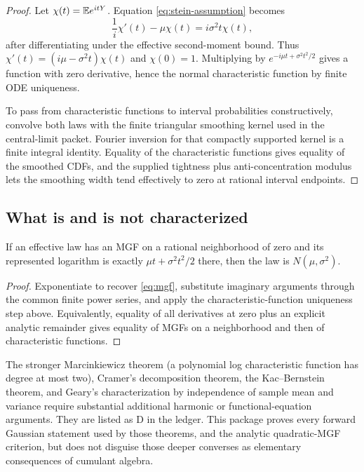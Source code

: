 \begin{proof}
Let $\chi(t)=\mathbb E e^{itY}$.  Equation \eqref{eq:stein-assumption} becomes
\[
 \frac1i\chi'(t)-\mu\chi(t)=i\sigma^2t\chi(t),
\]
after differentiating under the effective second-moment bound.  Thus
$\chi'(t)=(i\mu-\sigma^2t)\chi(t)$ and $\chi(0)=1$.  Multiplying by
$e^{-i\mu t+\sigma^2t^2/2}$ gives a function with zero derivative, hence the normal characteristic function by finite ODE uniqueness.

To pass from characteristic functions to interval probabilities constructively, convolve both laws with the finite triangular smoothing kernel used in the central-limit packet.  Fourier inversion for that compactly supported kernel is a finite integral identity.  Equality of the characteristic functions gives equality of the smoothed CDFs, and the supplied tightness plus anti-concentration modulus lets the smoothing width tend effectively to zero at rational interval endpoints.
\end{proof}

\subsection{What is and is not characterized}

\begin{proposition}\label{prop:quadratic-mgf}
If an effective law has an MGF on a rational neighborhood of zero and its represented logarithm is exactly
$\mu t+\sigma^2t^2/2$ there, then the law is $N(\mu,\sigma^2)$.
\end{proposition}

\begin{proof}
Exponentiate to recover \eqref{eq:mgf}, substitute imaginary arguments through the common finite power series, and apply the characteristic-function uniqueness step above.  Equivalently, equality of all derivatives at zero plus an explicit analytic remainder gives equality of MGFs on a neighborhood and then of characteristic functions.
\end{proof}

\begin{remark}
The stronger Marcinkiewicz theorem (a polynomial log characteristic function has degree at most two), Cramer's decomposition theorem, the Kac--Bernstein theorem, and Geary's characterization by independence of sample mean and variance require substantial additional harmonic or functional-equation arguments.  They are listed as D in the ledger.  This package proves every forward Gaussian statement used by those theorems, and the analytic quadratic-MGF criterion, but does not disguise those deeper converses as elementary consequences of cumulant algebra.
\end{remark}

